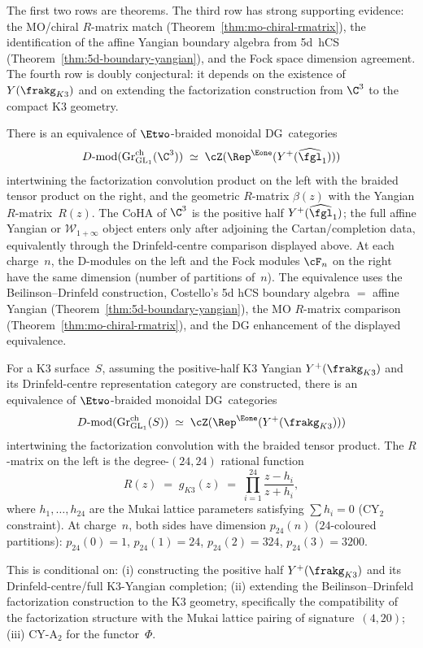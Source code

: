 \noindent The first two rows are theorems.
The third row has strong supporting evidence: the MO/chiral $R$-matrix match (Theorem~\ref{thm:mo-chiral-rmatrix}), the identification of the affine Yangian boundary algebra from 5d~hCS (Theorem~\ref{thm:5d-boundary-yangian}), and the Fock space dimension agreement.
The fourth row is doubly conjectural: it depends on the existence of $Y(\frakg_{K3})$ and on extending the factorization construction from $\C^3$ to the compact K3 geometry.

\begin{conjecture}
\label{conj:chiral-satake-c3}
\ClaimStatusConjectured
There is an equivalence of $\Etwo$-braided monoidal DG~categories
\[
 D\text{-}\mathrm{mod}(\mathrm{Gr}^{\mathrm{ch}}_{\mathrm{GL}_1}(\C^3)) \;\simeq\; \cZ(\Rep^{\Eone}(Y^+(\widehat{\fgl}_1)))
\]
intertwining the factorization convolution product on the left with the braided tensor product on the right, and the geometric $R$-matrix $\beta(z)$ with the Yangian $R$-matrix~$R(z)$. The CoHA of $\C^3$ is the positive half $Y^+(\widehat{\fgl}_1)$; the full affine Yangian or $\mathcal{W}_{1+\infty}$ object enters only after adjoining the Cartan/completion data, equivalently through the Drinfeld-centre comparison displayed above. At each charge~$n$, the D-modules on the left and the Fock modules $\cF_n$ on the right have the same dimension (number of partitions of~$n$). The equivalence uses the Beilinson--Drinfeld construction, Costello's 5d hCS boundary algebra \(=\) affine Yangian (Theorem~\ref{thm:5d-boundary-yangian}), the MO $R$-matrix comparison (Theorem~\ref{thm:mo-chiral-rmatrix}), and the DG enhancement of the displayed equivalence.
\end{conjecture}

\begin{conjecture}
\label{conj:chiral-satake-k3}
\ClaimStatusConjectured
For a K3 surface~$S$, assuming the positive-half K3 Yangian $Y^+(\frakg_{K3})$ and its Drinfeld-centre representation category are constructed, there is an equivalence of $\Etwo$-braided monoidal DG~categories
\[
 D\text{-}\mathrm{mod}(\mathrm{Gr}^{\mathrm{ch}}_{\mathrm{GL}_1}(S)) \;\simeq\; \cZ(\Rep^{\Eone}(Y^+(\frakg_{K3})))
\]
intertwining the factorization convolution with the braided tensor product. The $R$-matrix on the left is the degree-$(24,24)$ rational function
\[
 R(z) \;=\; g_{K3}(z) \;=\; \prod_{i=1}^{24} \frac{z - h_i}{z + h_i},
\]
where $h_1, \ldots, h_{24}$ are the Mukai lattice parameters satisfying $\sum h_i = 0$ (CY$_2$ constraint). At charge~$n$, both sides have dimension $p_{24}(n)$ ($24$-coloured partitions): $p_{24}(0) = 1$, $p_{24}(1) = 24$, $p_{24}(2) = 324$, $p_{24}(3) = 3200$.

This is conditional on: (i) constructing the positive half $Y^+(\frakg_{K3})$ and its Drinfeld-centre/full K3-Yangian completion; (ii) extending the Beilinson--Drinfeld factorization construction to the K3 geometry, specifically the compatibility of the factorization structure with the Mukai lattice pairing of signature~$(4,20)$; (iii) CY-A$_2$ for the functor~$\Phi$.
\end{conjecture}

